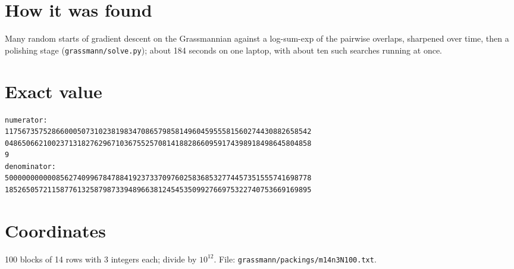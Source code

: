 \documentclass[11pt,a4paper]{article}
\begin{document}
\section{How it was found}
Many random starts of gradient descent on the Grassmannian against a log-sum-exp of the pairwise overlaps, sharpened over time, then a polishing stage (\texttt{grassmann/solve.py}); about 184 seconds on one laptop, with about ten such searches running at once.


\appendix
\section{Exact value}
{\small
\begin{verbatim}
numerator:
117567357528660005073102381983470865798581496045955581560274430882658542
048650662100237131827629671036755257081418828660959174398918498645804858
9
denominator:
500000000000856274099678478841923733709760258368532774457351555741698778
185265057211587761325879873394896638124545350992766975322740753669169895
\end{verbatim}}

\section{Coordinates}
100 blocks of 14 rows with 3 integers each; divide by $10^{12}$. File: \texttt{grassmann/packings/m14n3N100.txt}.
{\tiny
\begin{multicols}{3}
\end{multicols}}
\end{document}
